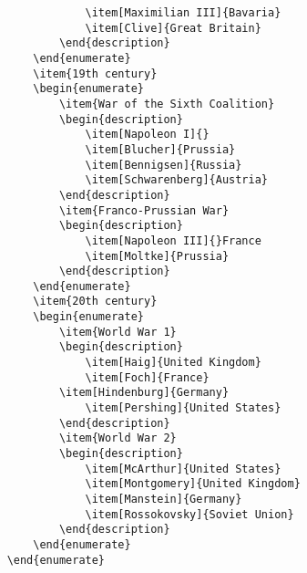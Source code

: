 \begin{verbatim}
                \item[Maximilian III]{Bavaria}
                \item[Clive]{Great Britain}
            \end{description}
        \end{enumerate}
        \item{19th century}
        \begin{enumerate}
            \item{War of the Sixth Coalition}
            \begin{description}
                \item[Napoleon I]{}
                \item[Blucher]{Prussia}
                \item[Bennigsen]{Russia}
                \item[Schwarenberg]{Austria}
            \end{description}
            \item{Franco-Prussian War}
            \begin{description}
                \item[Napoleon III]{}France
                \item[Moltke]{Prussia}
            \end{description}
        \end{enumerate}
        \item{20th century}
        \begin{enumerate}
            \item{World War 1}
            \begin{description}
                \item[Haig]{United Kingdom}
                \item[Foch]{France}
            \item[Hindenburg]{Germany}
                \item[Pershing]{United States}
            \end{description}
            \item{World War 2}
            \begin{description}
                \item[McArthur]{United States}
                \item[Montgomery]{United Kingdom}
                \item[Manstein]{Germany}
                \item[Rossokovsky]{Soviet Union}
            \end{description}
        \end{enumerate}
    \end{enumerate}
    
        \end{verbatim}

